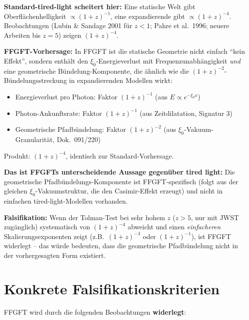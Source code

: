 \textbf{Standard-tired-light scheitert hier:} Eine statische Welt
gibt Oberflächenhelligkeit $\propto (1+z)^{-1}$, eine expandierende
gibt $\propto (1+z)^{-4}$. Beobachtungen (Lubin \& Sandage 2001 für
$z < 1$; Pahre et al.\ 1996; neuere Arbeiten bis $z = 5$) zeigen
$(1+z)^{-4}$.

\textbf{FFGFT-Vorhersage:} In FFGFT ist die statische Geometrie nicht
einfach \enquote{kein Effekt}, sondern enthält den
$\xi_0$-Energieverlust mit Frequenzunabhängigkeit \emph{und} eine
geometrische Bündelung-Komponente, die ähnlich wie die
$(1+z)^{-2}$-Bündelungsstreckung in expandierenden Modellen wirkt:
\begin{itemize}[leftmargin=2em,itemsep=2pt,topsep=2pt]
  \item Energieverlust pro Photon: Faktor $(1+z)^{-1}$ (aus $E \propto e^{-\xi_0 x}$)
  \item Photon-Ankunftsrate: Faktor $(1+z)^{-1}$ (aus Zeitdilatation, Signatur 3)
  \item Geometrische Pfadbündelung: Faktor $(1+z)^{-2}$ (aus $\xi_0$-Vakuum-Granularität,
        Dok.~091/220)
\end{itemize}
Produkt: $(1+z)^{-4}$, identisch zur Standard-Vorhersage.

\textbf{Das ist FFGFTs unterscheidende Aussage gegenüber tired
light:} Die geometrische Pfadbündelungs-Komponente ist FFGFT-spezifisch
(folgt aus der gleichen $\xi_0$-Vakuumstruktur, die den Casimir-Effekt
erzeugt) und nicht in einfachen tired-light-Modellen vorhanden.

\textbf{Falsifikation:} Wenn der Tolman-Test bei sehr hohem $z$
($z > 5$, nur mit JWST zugänglich) systematisch von $(1+z)^{-4}$
abweicht und einen \emph{einfacheren} Skalierungsexponenten zeigt
(z.B.\ $(1+z)^{-3}$ oder $(1+z)^{-1}$), ist FFGFT widerlegt -- das
würde bedeuten, dass die geometrische Pfadbündelung nicht in der
vorhergesagten Form existiert.

\section{Konkrete Falsifikationskriterien}

FFGFT wird durch die folgenden Beobachtungen \textbf{widerlegt}:

